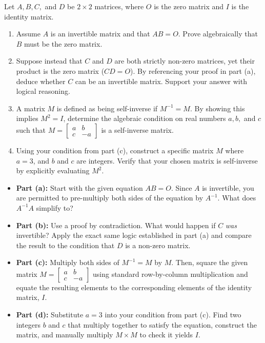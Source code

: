 \begin{problem}
Let $A, B, C,$ and $D$ be $2 \times 2$ matrices, where $O$ is the zero matrix and $I$ is the identity matrix.

\begin{enumerate}[label=\textbf{(\alph*)}]
    \item Assume $A$ is an invertible matrix and that $AB = O$. Prove algebraically that $B$ must be the zero matrix.
    \item Suppose instead that $C$ and $D$ are both strictly non-zero matrices, yet their product is the zero matrix ($CD = O$). By referencing your proof in part (a), deduce whether $C$ can be an invertible matrix. Support your answer with logical reasoning.
    \item A matrix $M$ is defined as being self-inverse if $M^{-1} = M$. By showing this implies $M^2 = I$, determine the algebraic condition on real numbers $a, b,$ and $c$ such that $M = \begin{bmatrix} a & b \\ c & -a \end{bmatrix}$ is a self-inverse matrix.
    \item Using your condition from part (c), construct a specific matrix $M$ where $a = 3$, and $b$ and $c$ are integers. Verify that your chosen matrix is self-inverse by explicitly evaluating $M^2$.
\end{enumerate}
\end{problem}

\begin{hint}
\begin{itemize}
    \item \textbf{Part (a):} Start with the given equation $AB = O$. Since $A$ is invertible, you are permitted to pre-multiply both sides of the equation by $A^{-1}$. What does $A^{-1}A$ simplify to?
    \item \textbf{Part (b):} Use a proof by contradiction. What would happen if $C$ \textit{was} invertible? Apply the exact same logic established in part (a) and compare the result to the condition that $D$ is a non-zero matrix.
    \item \textbf{Part (c):} Multiply both sides of $M^{-1} = M$ by $M$. Then, square the given matrix $M = \begin{bmatrix} a & b \\ c & -a \end{bmatrix}$ using standard row-by-column multiplication and equate the resulting elements to the corresponding elements of the identity matrix, $I$.
    \item \textbf{Part (d):} Substitute $a=3$ into your condition from part (c). Find two integers $b$ and $c$ that multiply together to satisfy the equation, construct the matrix, and manually multiply $M \times M$ to check it yields $I$.
\end{itemize}
\end{hint}

